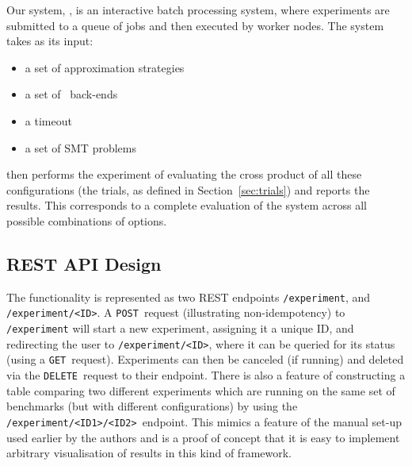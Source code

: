 \documentclass[a4paper]{IEEEtran}
\begin{document}
Our system, \testbench{}, is an interactive batch processing system,
where experiments are submitted to a queue of jobs and then executed
by worker nodes. The system takes as its input:
\begin{itemize}
  \item a set of approximation strategies
  \item a set of \uppsat{}\ back-ends
  \item a timeout
  \item a set of SMT problems
\end{itemize}
\testbench{} then performs the experiment of evaluating the cross product of all
these configurations (the trials, as defined in Section~\ref{sec:trials})
and reports the results. This corresponds to a complete evaluation of the system
across all possible combinations of options. 

\subsection{REST API Design}

The functionality is represented as two REST endpoints
\texttt{/experiment}, and \texttt{/experiment/<ID>}. A
\texttt{POST}~request (illustrating non-idempotency) to
\texttt{/experiment} will start a new experiment, assigning it a
unique ID, and redirecting the user to \texttt{/experiment/<ID>},
where it can be queried for its status (using a
\texttt{GET}~request). Experiments can then be canceled (if running)
and deleted via the \texttt{DELETE}~request to their endpoint. There
is also a feature of constructing a table comparing two different
experiments which are running on the same set of benchmarks (but with
different configurations) by using the
\texttt{/experiment/<ID1>/<ID2>}~endpoint. This mimics a feature of
the manual set-up used earlier by the authors and is a proof of
concept that it is easy to implement arbitrary visualisation of
results in this kind of framework.
\end{document}

